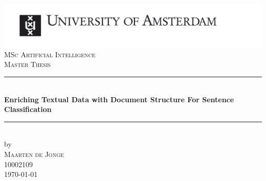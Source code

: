 \begin{titlepage}

\newcommand{\HRule}{\rule{\linewidth}{0.5mm}} %
\center %
 

\includegraphics[width=\linewidth]{figures/uvaeng}\\[2.5cm]
\textsc{\Large MSc Artificial Intelligence}\\[0.2cm]
\textsc{\Large Master Thesis}\\[0.5cm] 


\HRule \\[0.4cm]
{ \huge \bfseries Enriching Textual Data with Document Structure For Sentence
Classification}\\[0.4cm] %
\HRule \\[0.5cm]
 

by\\[0.2cm]
\textsc{\Large{Maarten de Jonge}}\\[0.2cm] %
10002109 \\[1cm]



{\Large \today}\\[1cm] %


\end{titlepage}
